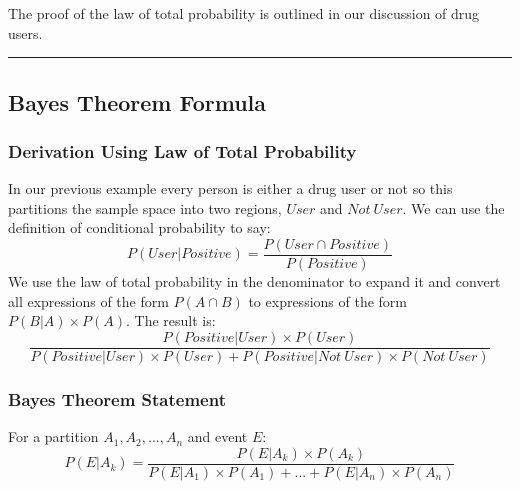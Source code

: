 \documentclass[
]{book}
\begin{document}
The proof of the law of total probability is outlined in our discussion of drug users.

\begin{center}\rule{0.5\linewidth}{0.5pt}\end{center}

\hypertarget{bayes-theorem-formula}{%
\subsection{Bayes Theorem Formula}\label{bayes-theorem-formula}}

\hypertarget{derivation-using-law-of-total-probability}{%
\subsubsection{Derivation Using Law of Total Probability}\label{derivation-using-law-of-total-probability}}

In our previous example every person is either a drug user or not so this partitions the sample space into two regions, \(User\) and \(Not \ User\). We can use the definition of conditional probability to say:
\[P(User|Positive)=\frac{P(User \cap Positive)}{P(Positive)}\]
We use the law of total probability in the denominator to expand it and convert all expressions of the form \(P(A \cap B)\) to expressions of the form \(P(B | A) \times P(A)\). The result is:
\[\frac{P(Positive|User) \times P(User)}{P(Positive|User) \times P(User)+P(Positive|Not \ User) \times P(Not \ User)}\]

\hypertarget{bayes-theorem-statement}{%
\subsubsection{Bayes Theorem Statement}\label{bayes-theorem-statement}}

For a partition \(A_1,A_2,...,A_n\) and event \(E\):
\[P(E|A_k) = \frac{P(E|A_k) \times P(A_k)}{P(E|A_1) \times P(A_1) +...+ P(E|A_n) \times P(A_n)}\]

\backmatter
  
\end{document}

